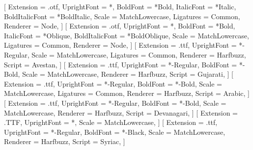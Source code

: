 %
[%
   Extension      = .otf,%
   UprightFont    = *,%
   BoldFont       = *Bold,%
   ItalicFont     = *Italic,%
   BoldItalicFont = *BoldItalic,%
   Scale          = MatchLowercase,%
   Ligatures      = {Common},%
   Renderer       = Node,%
]%
%
[%
   Extension      = .otf,%
   UprightFont    = *,%
   BoldFont       = *Bold,%
   ItalicFont     = *Oblique,%
   BoldItalicFont = *BoldOblique,%
   Scale          = MatchLowercase,%
   Ligatures      = {Common},%
   Renderer       = Node,%
]%
%
[%
   Extension      = .ttf,%
   UprightFont    = *-Regular,%
   Scale          = MatchLowercase,%
   Ligatures      = {Common},%
   Renderer       = Harfbuzz,%
   Script         = Avestan,%
]%
%
[%
   Extension      = .ttf,%
   UprightFont    = *-Regular,%
   BoldFont       = *-Bold,%
   Scale          = MatchLowercase,%
   Renderer       = Harfbuzz,%
   Script         = Gujarati,%
]%
%
[%
   Extension      = .ttf,%
   UprightFont    = *-Regular,%
   BoldFont       = *-Bold,%
   Scale          = MatchLowercase,%
   Ligatures      = {Common},%
   Renderer       = Harfbuzz,%
   Script         = Arabic,%
]%
%
[%
   Extension      = .ttf,%
   UprightFont    = *-Regular,%
   BoldFont       = *-Bold,%
   Scale          = MatchLowercase,%
   Renderer       = Harfbuzz,%
   Script         = Devanagari,%
]%
%
[%
   Extension      = .TTF,%
   UprightFont    = *,%
   Scale          = MatchLowercase,%
]%
%
[%
   Extension      = .ttf,%
   UprightFont    = *-Regular,%
   BoldFont       = *-Black,%
   Scale          = MatchLowercase,%
   Renderer       = Harfbuzz,%
   Script         = Syriac,%
]%

\newcommand{\textarabic}[1]{%
   \bgroup\microtypesetup{activate=false}\textdir TRT\arabicfont #1\egroup}
\newcommand{\textavestan}[1]{%
   \bgroup\microtypesetup{activate=false}\textdir TRT\avestanfont #1\egroup}
\newcommand{\textgujarati}[1]{%
   \bgroup\microtypesetup{activate=false}\gujaratifont #1\egroup}
\newcommand{\textpahlavi}[1]{%
   \bgroup\microtypesetup{activate=false}\textdir TRT\pahlavifont #1\egroup}
\newcommand{\textsanskrit}[1]{%
   \bgroup\microtypesetup{activate=false}\sanskritfont #1\egroup}
\newcommand{\textsyriac}[1]{%
   \bgroup\microtypesetup{activate=false}\syriacfont #1\egroup}

